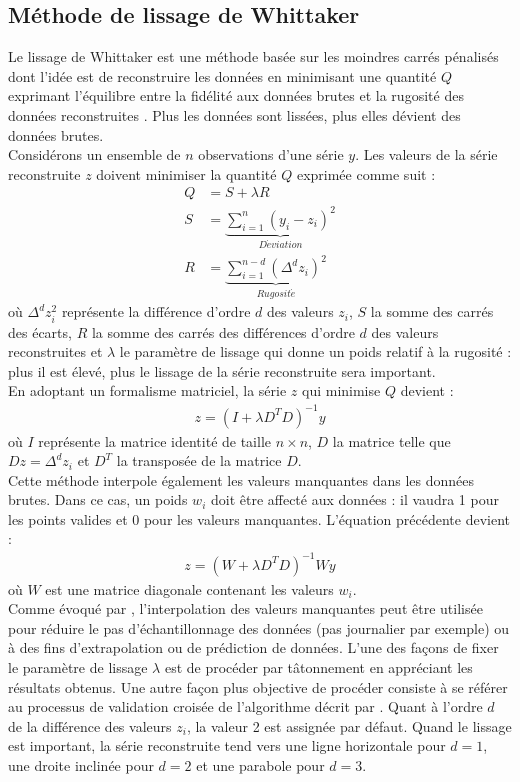 \subsection{Méthode de lissage de Whittaker}

Le lissage de Whittaker est une méthode basée sur les moindres carrés pénalisés dont l'idée est de reconstruire les données en minimisant une quantité $Q$ exprimant l'équilibre entre la fidélité aux données brutes et la rugosité des données reconstruites \citep{Eilers2003,Atzberger2011,Atkinson2012}. Plus les données sont lissées, plus elles dévient des données brutes. \\
Considérons un ensemble de $n$ observations d'une série $y$. Les valeurs de la série reconstruite $z$ doivent minimiser la quantité $Q$ exprimée comme suit :
\begin{align}
 Q &= S + \lambda R \\
 S &= \underbrace{\sum_{i=1}^{n} (y_{i} - z_{i})^2}_{D\acute{e}viation} \\
 R &= \underbrace{\sum_{i=1}^{n-d} (\Delta^d z_{i})^2}_{Rugosit\acute{e}}
\end{align}
où $\Delta^d z_{i}^2$ représente la différence d'ordre $d$ des valeurs $z_{i}$, $S$ la somme des carrés des écarts, $R$ la somme des carrés des différences d'ordre $d$ des valeurs reconstruites et $\lambda$ le paramètre de lissage qui donne un poids relatif à la rugosité : plus il est élevé, plus le lissage de la série reconstruite sera important.\\
En adoptant un formalisme matriciel, la série $z$ qui minimise $Q$ devient :
\begin{align}
 z = (I + \lambda D^{T}D)^{-1} y
\end{align}
où $I$ représente la matrice identité de taille $n\times n$, $D$ la matrice telle que $D z = \Delta^d z_{i}$ et $D^{T}$ la transposée de la matrice $D$.\\
Cette méthode interpole également les valeurs manquantes dans les données brutes. Dans ce cas, un poids $w_{i}$ doit être affecté aux données : il vaudra 1 pour les points valides et 0 pour les valeurs manquantes. L'équation précédente devient :
\begin{align}
 z = (W + \lambda D^{T}D)^{-1} Wy
\end{align}
où $W$ est une matrice diagonale contenant les valeurs $w_{i}$.\\
Comme évoqué par \citet{Atzberger2011}, l'interpolation des valeurs manquantes peut être utilisée pour réduire le pas d'échantillonnage des données (pas journalier par exemple) ou à des fins d'extrapolation ou de prédiction de données. L'une des façons de fixer le paramètre de lissage $\lambda$ est de procéder par tâtonnement en appréciant les résultats obtenus. Une autre façon plus objective de procéder consiste à se référer au processus de validation croisée de l'algorithme décrit par \citet{Eilers2003}. Quant à l'ordre $d$ de la différence des valeurs $z_{i}$, la valeur 2 est assignée par défaut. Quand le lissage est important, la série reconstruite tend vers une ligne horizontale pour $d=1$, une droite inclinée pour $d=2$ et une parabole pour $d=3$.

